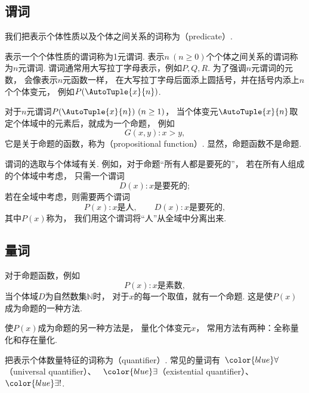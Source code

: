 \subsection{谓词}
我们把表示个体性质以及个体之间关系的词称为（predicate）.

表示一个个体性质的谓词称为1元谓词.
表示\(n\ (n\geq0)\)个个体之间关系的谓词称为\(n\)元谓词.
谓词通常用大写拉丁字母表示，例如\(P,Q,R\).
为了强调\(n\)元谓词的元数，
会像表示\(n\)元函数一样，
在大写拉丁字母后面添上圆括号，并在括号内添上\(n\)个个体变元，
例如\(P(\AutoTuple{x}{n})\).

对于\(n\)元谓词\(P(\AutoTuple{x}{n})\ (n\geq1)\)，
当个体变元\(\AutoTuple{x}{n}\)取定个体域中的元素后，就成为一个命题，
例如\begin{equation*}
	G(x,y):
	x>y,
\end{equation*}
它是关于命题的函数，称为（propositional function）.
显然，命题函数不是命题.

\begin{remark}
谓词的选取与个体域有关.
例如，对于命题“所有人都是要死的”，
若在所有人组成的个体域中考虑，
只需一个谓词\begin{equation*}
	D(x):
	\text{$x$是要死的};
\end{equation*}
若在全域中考虑，则需要两个谓词\begin{equation*}
	P(x):
	\text{$x$是人},
	\qquad
	D(x):
	\text{$x$是要死的},
\end{equation*}
其中\(P(x)\)称为，
我们用这个谓词将“人”从全域中分离出来.
\end{remark}

\subsection{量词}
对于命题函数，例如\begin{equation*}
	P(x):
	\text{$x$是素数},
\end{equation*}
当个体域\(D\)为自然数集\(\mathbb{N}\)时，
对于\(x\)的每一个取值，就有一个命题.
这是使\(P(x)\)成为命题的一种方法.

使\(P(x)\)成为命题的另一种方法是，
量化个体变元\(x\)，
常用方法有两种：全称量化和存在量化.

把表示个体数量特征的词称为（quantifier）.
常见的量词有~\(\color{blue}\forall\)（universal quantifier）、
~\(\color{blue}\exists\)（existential quantifier）、
~\(\color{blue}\exists!\).

